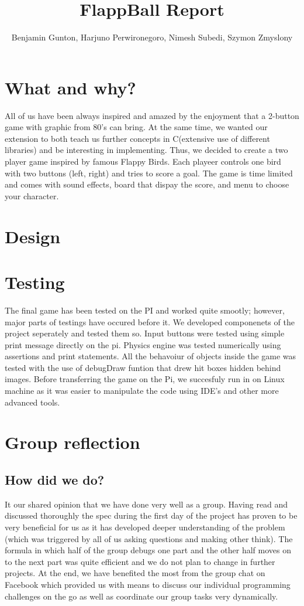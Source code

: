 \documentclass[11pt]{article}
\begin{document}
\title{FlappBall Report}
\author{Benjamin Gunton, Harjuno Perwironegoro, Nimesh Subedi, Szymon Zmyslony}

\maketitle

\section{What and why?}
All of us have been always inspired and amazed by the enjoyment that a 2-button game with graphic from 80's can bring. At the same time, we wanted our extension to both teach us further concepts in C(extensive use of different libraries) and be interesting in implementing. Thus, we decided to create a two player game inspired by famous Flappy Birds. Each playeer controls one bird with two buttons (left, right) and tries to score a goal. The game is time limited and comes with sound effects, board that dispay the score, and menu to choose your character.
\section{Design}


\section{Testing}
The final game has been tested on the PI and worked quite smootly; however, major parts of testings have occured before it. We developed componenets of the project seperately and tested them so. Input buttons were tested using simple print message directly on the pi. Physics engine was tested numerically using assertions and print statements. All the behavoiur of objects inside the game was tested with the use of debugDraw funtion that drew hit boxes hidden behind images. Before transferring the game on the Pi, we succesfuly run in on Linux machine as it was easier to manipulate the code using IDE's and other more advanced tools. 
\section{Group reflection}
\subsection{How did we do?}
It our shared opinion that we have done very well as a group. Having read and discussed thoroughly  the spec during the first day of the project has proven to be very beneficial for us as it has developed deeper understanding of the problem (which was triggered by all of us asking questions and making other think). The formula in which half of the group debugs one part and the other half moves on to the next part was quite efficient and we do not plan to change in further projects. At the end, we have benefited the most from the group chat on Facebook which provided us with means to discuss our individual programming challenges on the go as well as coordinate our group tasks very dynamically. 
\end{document}
